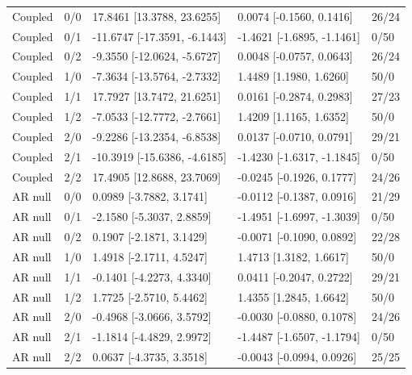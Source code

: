 \begin{tabular}{lllll}
Coupled & 0/0 & 17.8461 [13.3788, 23.6255] & 0.0074 [-0.1560, 0.1416] & 26/24 \\
Coupled & 0/1 & -11.6747 [-17.3591, -6.1443] & -1.4621 [-1.6895, -1.1461] & 0/50 \\
Coupled & 0/2 & -9.3550 [-12.0624, -5.6727] & 0.0048 [-0.0757, 0.0643] & 26/24 \\
Coupled & 1/0 & -7.3634 [-13.5764, -2.7332] & 1.4489 [1.1980, 1.6260] & 50/0 \\
Coupled & 1/1 & 17.7927 [13.7472, 21.6251] & 0.0161 [-0.2874, 0.2983] & 27/23 \\
Coupled & 1/2 & -7.0533 [-12.7772, -2.7661] & 1.4209 [1.1165, 1.6352] & 50/0 \\
Coupled & 2/0 & -9.2286 [-13.2354, -6.8538] & 0.0137 [-0.0710, 0.0791] & 29/21 \\
Coupled & 2/1 & -10.3919 [-15.6386, -4.6185] & -1.4230 [-1.6317, -1.1845] & 0/50 \\
Coupled & 2/2 & 17.4905 [12.8688, 23.7069] & -0.0245 [-0.1926, 0.1777] & 24/26 \\
AR null & 0/0 & 0.0989 [-3.7882, 3.1741] & -0.0112 [-0.1387, 0.0916] & 21/29 \\
AR null & 0/1 & -2.1580 [-5.3037, 2.8859] & -1.4951 [-1.6997, -1.3039] & 0/50 \\
AR null & 0/2 & 0.1907 [-2.1871, 3.1429] & -0.0071 [-0.1090, 0.0892] & 22/28 \\
AR null & 1/0 & 1.4918 [-2.1711, 4.5247] & 1.4713 [1.3182, 1.6617] & 50/0 \\
AR null & 1/1 & -0.1401 [-4.2273, 4.3340] & 0.0411 [-0.2047, 0.2722] & 29/21 \\
AR null & 1/2 & 1.7725 [-2.5710, 5.4462] & 1.4355 [1.2845, 1.6642] & 50/0 \\
AR null & 2/0 & -0.4968 [-3.0666, 3.5792] & -0.0030 [-0.0880, 0.1078] & 24/26 \\
AR null & 2/1 & -1.1814 [-4.4829, 2.9972] & -1.4487 [-1.6507, -1.1794] & 0/50 \\
AR null & 2/2 & 0.0637 [-4.3735, 3.3518] & -0.0043 [-0.0994, 0.0926] & 25/25 \\
\end{tabular}
